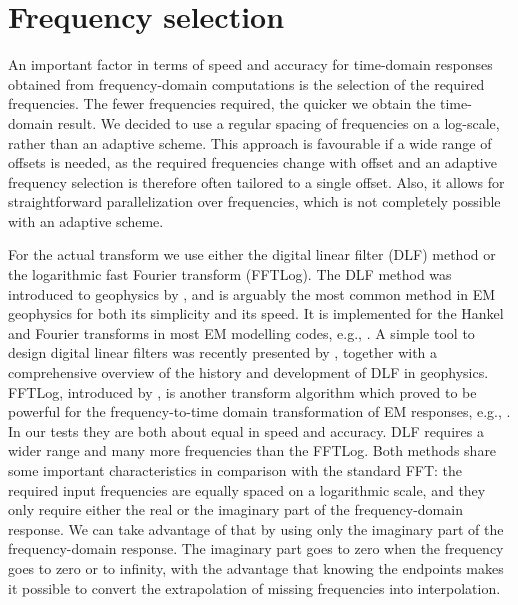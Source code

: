 \documentclass[onecolumn,extra,referee,camera]{gji}
\begin{document}
\section{Frequency selection} %

An important factor in terms of speed and accuracy for time-domain responses
obtained from frequency-domain computations is the selection of the required
frequencies. The fewer frequencies required, the quicker we obtain the
time-domain result.  We decided to use a regular spacing of frequencies on a
log-scale, rather than an adaptive scheme. This approach is favourable if a
wide range of offsets is needed, as the required frequencies change with offset
and an adaptive frequency selection is therefore often tailored to a single
offset. Also, it allows for straightforward parallelization over frequencies,
which is not completely possible with an adaptive scheme.

For the actual transform we use either the digital linear filter (DLF) method
or the logarithmic fast Fourier transform (FFTLog). The DLF method was
introduced to geophysics by \cite{GP.71.Ghosh}, and is arguably the most common
method in EM geophysics for both its simplicity and its speed. It is
implemented for the Hankel and Fourier transforms in most EM modelling codes,
e.g., \cite{GEO.09.Key}. A simple tool to design digital linear filters was
recently presented by \cite{GEO.19.Werthmuller}, together with a comprehensive
overview of the history and development of DLF in geophysics. FFTLog,
introduced by \cite{RAS.00.Hamilton}, is another transform algorithm which
proved to be powerful for the frequency-to-time domain transformation of EM
responses, e.g., \cite{INT.14.Werthmuller}. In our tests they are both about
equal in speed and accuracy. DLF requires a wider range and many more
frequencies than the FFTLog. Both methods share some important characteristics
in comparison with the standard FFT: the required input frequencies are equally
spaced on a logarithmic scale, and they only require either
the real or the imaginary part of the frequency-domain response. We can take
advantage of that by using only the imaginary part of the frequency-domain
response. The imaginary part goes to zero when the frequency goes to zero or to
infinity, with the advantage that knowing the endpoints makes it possible to
convert the extrapolation of missing frequencies into interpolation.
\end{document}
